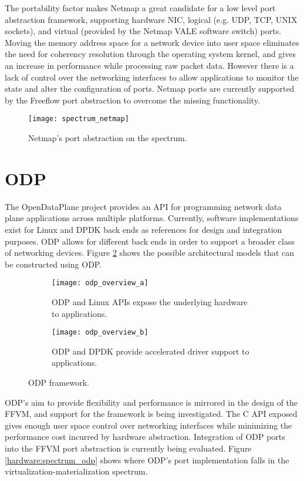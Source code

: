 The portability factor makes Netmap a great candidate for a low level port
abstraction framework, supporting hardware NIC, logical (e.g. UDP, TCP,
UNIX sockets), and virtual (provided by the Netmap VALE software switch) ports.
Moving the memory address space for a network device into user space eliminates
the need for coherency resolution through the operating system kernel, and gives
an increase in performance while processing raw packet data. However there is a
lack of control over the networking interfaces to allow applications to monitor
the state and alter the configuration of ports. Netmap ports are currently
supported by the Freeflow port abstraction to overcome the missing
functionality.

\begin{figure}[h!]
  \centering
  \texttt{[image: spectrum\_netmap]}
  \caption{Netmap's port abstraction on the spectrum.}
  \label{hardware:spectrum_netmap}
\end{figure}

\section{ODP}
\label{hardware:odp}
The OpenDataPlane project provides an API for programming network data plane
applications across multiple platforms. Currently, software implementations
exist for Linux and DPDK back ends as references for design and integration
purposes. ODP allows for different back ends in order to support a broader class
of networking devices. Figure \ref{hardware:odp_overview} shows the possible
architectural models that can be constructed using ODP.

\begin{figure}[h!]
  \centering
  \begin{subfigure}[b]{0.48\textwidth}
    \centering
    \texttt{[image: odp\_overview\_a]}
    \caption{ODP and Linux APIs expose the underlying hardware to applications.}
  \end{subfigure}
  \hfill
  \begin{subfigure}[b]{0.48\textwidth}
    \centering
    \texttt{[image: odp\_overview\_b]}
    \caption{ODP and DPDK provide accelerated driver support to applications.}
  \end{subfigure}
  \caption{ODP framework.}
  \label{hardware:odp_overview}
\end{figure}

ODP's aim to provide flexibility and performance is mirrored in the design of the
FFVM, and support for the framework is being investigated. The C API exposed gives
enough user space control over networking interfaces while minimizing the
performance cost incurred by hardware abstraction. Integration of ODP ports
into the FFVM port abstraction is currently being evaluated. Figure
\ref{hardware:spectrum_odp} shows where ODP's port implementation falls in the
virtualization-materialization spectrum.

